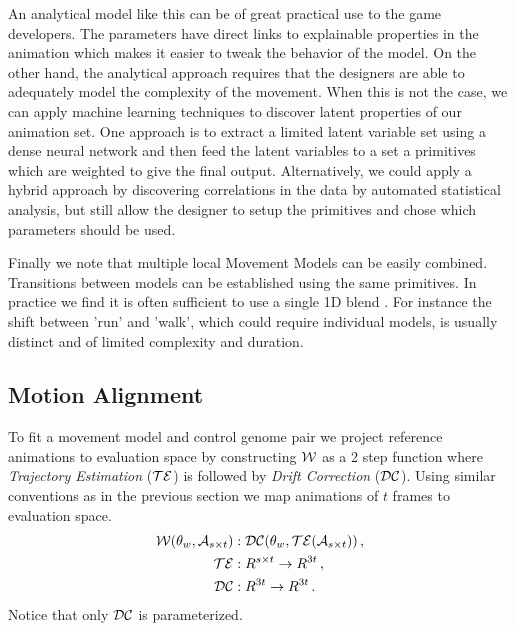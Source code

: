 An analytical model like this can be of great practical use to the game developers. The parameters have direct links to explainable properties in the animation which makes it easier to tweak the behavior of the model. On the other hand, the analytical approach requires that the designers are able to adequately model the complexity of the movement. 
%
When this is not the case, we can apply machine learning techniques to discover latent properties of our animation set. %
One approach is to extract a limited latent variable set using a dense neural network and then feed the latent variables to a set a primitives which are weighted to give the final output. 
Alternatively, we could apply a hybrid approach by discovering correlations in the data by automated statistical analysis, but still allow the designer to setup the primitives and chose which parameters should be used. 

Finally we note that multiple local Movement Models can be easily combined. Transitions between models can be established using the same primitives. In practice we find it is often sufficient to use a single 1D blend . For instance the shift between 'run' and 'walk', which could require individual models, is usually distinct and of limited complexity and duration. 

\subsection{Motion Alignment}
To fit a movement model and control genome pair we project reference animations to evaluation space by constructing $\mathcal{W}$ as a 2 step function where \textit{Trajectory Estimation} ($\mathcal{TE}$) is followed by \textit{Drift Correction} ($\mathcal{DC}$). Using similar conventions as in the previous section we map animations of $t$ frames to evaluation space. 
\begin{subequations}
\begin{align}
    \mathcal{W}(\theta_{w},\mathcal{A}_{s\times{t}})&:\mathcal{DC}(\theta_{w},\mathcal{TE}(\mathcal{A}_{s\times{t}})) \,,\\
    \mathcal{TE}&:R^{s\times{t}} \rightarrow  R^{3t} \,,\\
    \mathcal{DC}&:R^{3t} \rightarrow R^{3t} \,.
\end{align}
\end{subequations}
Notice that only $\mathcal{DC}$ is parameterized.


